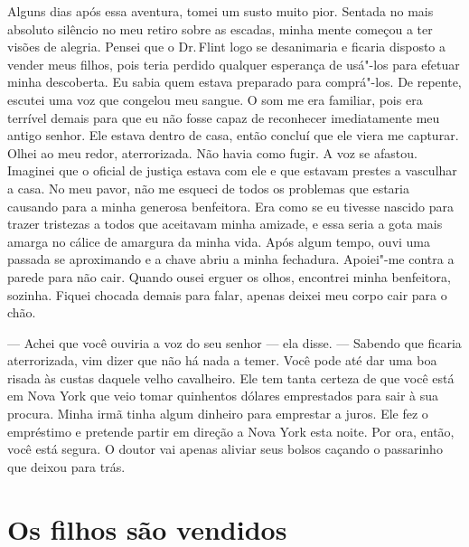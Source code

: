 Alguns dias após essa aventura, tomei
um susto muito pior. Sentada no mais absoluto silêncio no meu retiro
sobre as escadas, minha mente começou a ter visões de alegria. Pensei
que o Dr.\,Flint logo se desanimaria e ficaria disposto a vender meus
filhos, pois teria perdido qualquer esperança de usá"-los para efetuar
minha descoberta. Eu sabia quem estava preparado para comprá"-los. De
repente, escutei uma voz que congelou meu sangue. O som me era familiar,
pois era terrível demais para que eu não fosse capaz de reconhecer
imediatamente meu antigo senhor. Ele estava dentro de casa, então
concluí que ele viera me capturar. Olhei ao meu redor, aterrorizada. Não
havia como fugir. A voz se afastou. Imaginei que o oficial de justiça
estava com ele e que estavam prestes a vasculhar a casa. No meu pavor,
não me esqueci de todos os problemas que estaria causando para a minha
generosa benfeitora. Era como se eu tivesse nascido para trazer
tristezas a todos que aceitavam minha amizade, e essa seria a gota mais
amarga no cálice de amargura da minha vida. Após algum tempo, ouvi uma
passada se aproximando e a chave abriu a minha fechadura. Apoiei"-me
contra a parede para não cair. Quando ousei erguer os olhos, encontrei
minha benfeitora, sozinha. Fiquei chocada demais para falar, apenas
deixei meu corpo cair para o chão.

--- Achei que você ouviria a voz do seu
senhor --- ela disse. --- Sabendo que ficaria aterrorizada, vim dizer
que não há nada a temer. Você pode até dar uma boa risada às custas
daquele velho cavalheiro. Ele tem tanta certeza de que você está em Nova
York que veio tomar quinhentos dólares emprestados para sair à sua
procura. Minha irmã tinha algum dinheiro para emprestar a juros. Ele fez
o empréstimo e pretende partir em direção a Nova York esta noite. Por
ora, então, você está segura. O doutor vai apenas aliviar seus bolsos
caçando o passarinho que deixou para trás.

\chapter*{Os filhos são vendidos}

